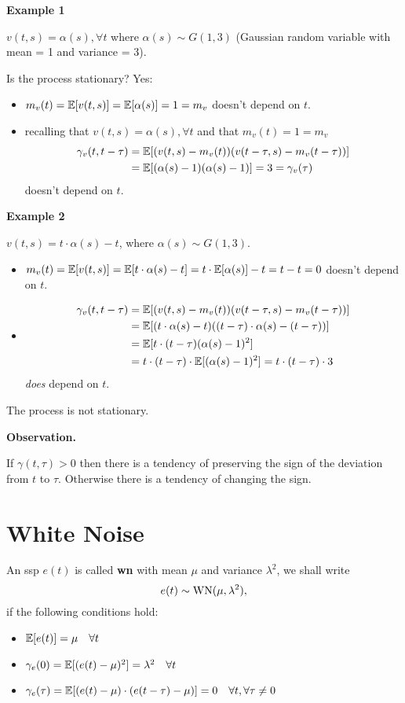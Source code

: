 \textbf{Example 1}

$v(t,s)=\alpha (s),\forall t$ where $\alpha (s)\sim G(1,3)$ (Gaussian random variable with mean = 1 and variance = 3).

Is the process stationary? Yes:
\begin{itemize}
	\item $m_{v}(t)=\mathbb{E}[v(t, s)]=\mathbb{E}[\alpha(s)]=1=m_{v}$ doesn't depend on $t$.
	\item recalling that $v(t, s)=\alpha(s), \forall t$ and that $m_{v}(t)=1=m_{v}$
	\begin{align*}
		\gamma_{v}(t, t-\tau)&=\mathbb{E}[(v(t, s)-m_{v}(t))(v(t-\tau, s)-m_{v}(t-\tau))]\\
		&=\mathbb{E}[(\alpha(s)-1)(\alpha(s)-1)]=3=\gamma_{v}(\tau)
	\end{align*}
	 doesn't depend on $t$.
\end{itemize}

\textbf{Example 2}

$v(t, s)=t \cdot \alpha(s)-t$, where $\alpha(s) \sim G(1,3)$.
\begin{itemize}
	\item $m_{v}(t)=\mathbb{E}[v(t, s)]=\mathbb{E}[t \cdot \alpha(s)-t]=t \cdot \mathbb{E}[\alpha(s)]-t=t-t=0$ doesn't depend on $t$.
	\item \begin{align*}
		\gamma_{v}(t, t-\tau)&=\mathbb{E}[(v(t, s)-m_{v}(t))(v(t-\tau, s)-m_{v}(t-\tau))]\\
	&=\mathbb{E}[(t \cdot \alpha(s)-t)((t-\tau) \cdot \alpha(s)-(t-\tau))]\\
	&=\mathbb{E}[t \cdot(t-\tau)(\alpha(s)-1)^{2}]\\
	&=t \cdot(t-\tau) \cdot \mathbb{E}[(\alpha(s)-1)^{2}]=t \cdot(t-\tau) \cdot 3
	\end{align*}
	\emph{does} depend on $t$.
\end{itemize}
The process is not stationary.

\textbf{Observation.}

If $\gamma(t, \tau)>0$ then there is a tendency of preserving the sign of the deviation from $t$ to $\tau $. Otherwise there is a tendency of changing the sign.

\section{White Noise}

An \gls{ssp} $e(t)$ is called \textbf{\gls{wn}} with mean $\mu$ and variance $\lambda^{2}$, we shall write
\[
	e(t) \sim \operatorname{WN}(\mu, \lambda^{2}),
\]
if the following conditions hold:
\begin{itemize}
	\item $\mathbb{E}[e(t)]=\mu \quad \forall t$
	\item $\gamma_{e}(0)=\mathbb{E}[(e(t)-\mu)^{2}]=\lambda^{2} \quad \forall t$
	\item $\gamma_{e}(\tau)=\mathbb{E}[(e(t)-\mu) \cdot(e(t-\tau)-\mu)]=0 \quad \forall t, \forall \tau \neq 0$
\end{itemize}

